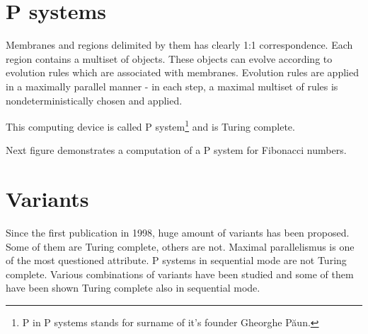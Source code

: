 \documentclass[myposter,portrait]{sciposter}
\def\mysection#1{
{\color{sectionCol}\section*{\sc\bfseries #1}}}
\begin{document}
\begin{multicols*}{3}


\mysection{P systems}

Membranes and regions delimited by them has clearly 1:1 correspondence. Each region contains a multiset of objects. These objects can evolve according to evolution rules which are associated with membranes. Evolution rules are applied in a maximally parallel manner - in each step, a maximal multiset of rules is nondeterministically chosen and applied.

This computing device is called P system\footnote{P in P systems stands for surname of it's founder Gheorghe P\u aun.} and is Turing complete.

Next figure demonstrates a computation of a P system for Fibonacci numbers.

\mysection{Variants}

Since the first publication in 1998, huge amount of variants has been proposed. Some of them are Turing complete, others are not. Maximal parallelismus is one of the most questioned attribute. P systems in sequential mode are not Turing complete. Various combinations of variants have been studied and some of them have been shown Turing complete also in sequential mode.


\end{multicols*}
\end{document}
